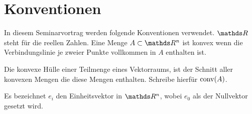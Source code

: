 
\section*{Konventionen}

In diesem Seminarvortrag werden folgende Konventionen verwendet.
$\R$ steht für die reellen Zahlen. Eine Menge $A \subset \R^n$ ist konvex
wenn die Verbindungslinie je zweier Punkte vollkommen in $A$ enthalten ist.

Die konvexe Hülle einer Teilmenge eines Vektorraums, ist der Schnitt
aller konvexen Mengen die diese Mengen enthalten. Schreibe hierfür $\operatorname{conv}(A)$.

Es bezeichnet $e_i$ den Einheitsvektor in $\R^n$, wobei $e_0$ als der Nullvektor gesetzt wird.








